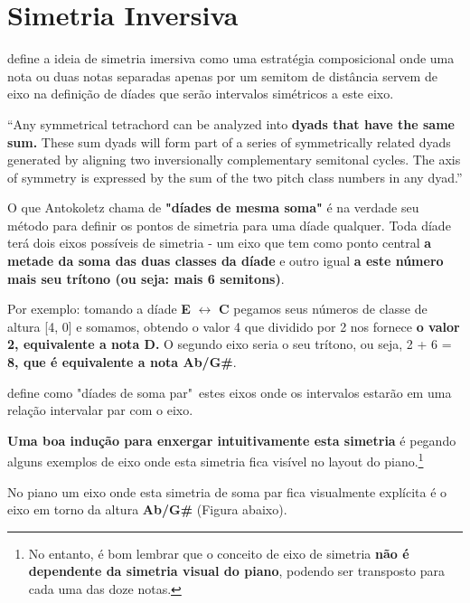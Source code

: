 \documentclass[
	12pt,				%
	openright,			%
	twoside,			%
	a4paper,			%
	english,			%
	french,				%
	spanish,			%
	brazil				%
	]{abntex2}
\begin{document}
 

\pagebreak
\section{Simetria Inversiva}

 define a ideia de simetria imersiva como uma estratégia composicional onde uma nota ou duas notas separadas apenas por um semitom de distância servem de eixo na definição de díades que serão intervalos simétricos a este eixo.

\begin{citacao}
“Any symmetrical tetrachord can be analyzed into\textbf{ dyads that have the same sum.} These sum dyads will form part of a series of symmetrically related dyads generated by aligning two inversionally complementary semitonal cycles. The axis of symmetry is expressed by the sum of the two pitch class numbers in any dyad.”
\cite[ p.72]{antokoletz1984music}
\end{citacao}

O que Antokoletz chama de \textbf{"díades de mesma soma"} é na verdade seu método para definir os pontos de simetria para uma díade qualquer. Toda díade terá dois eixos possíveis de simetria - um eixo que tem como ponto central \textbf{a metade da soma das duas classes da díade} e outro igual \textbf{a este número mais seu trítono (ou seja: mais 6 semitons)}. 

Por exemplo: tomando a díade \textbf{E} $\leftrightarrow $ \textbf{C} pegamos seus números de classe de altura [4, 0] e somamos, obtendo o valor 4 que dividido por 2 nos fornece \textbf{o valor 2, equivalente a nota D.} O segundo eixo seria o seu trítono, ou seja, 2 + 6 =\textbf{ 8, que é equivalente a nota Ab/G\#}. 
\pagebreak

 define como "díades de soma par"\ estes eixos onde os intervalos estarão em uma relação intervalar par com o eixo.

\textbf{Uma boa indução para enxergar intuitivamente esta simetria} é pegando alguns exemplos de eixo onde esta simetria fica visível no layout do piano.\footnote{No entanto, é bom lembrar que o conceito de eixo de simetria \textbf{não é dependente  da simetria visual do piano}, podendo ser transposto para cada uma das doze notas.}

No piano um eixo onde esta simetria de soma par fica visualmente explícita é o eixo em torno da altura \textbf{Ab/G\#} (Figura abaixo).
\end{document}
